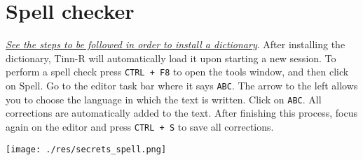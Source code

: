 
\section{Spell checker}

\textit{\href{\#configuration\_spellerinstalation}{See the steps to be followed in order to install a dictionary}}.
After installing the dictionary, Tinn-R will automatically load it upon starting a new session.
To perform a spell check press \texttt{CTRL + F8} to open the tools window, and then click on Spell.
Go to the editor task bar where it says \texttt{ABC}.
The arrow to the left allows you to choose the language in which the text is written.
Click on \texttt{ABC}. All corrections are automatically added to the text. After finishing this process,
focus again on the editor and press \texttt{CTRL + S} to save all corrections.

\texttt{[image: ./res/secrets\_spell.png]}
